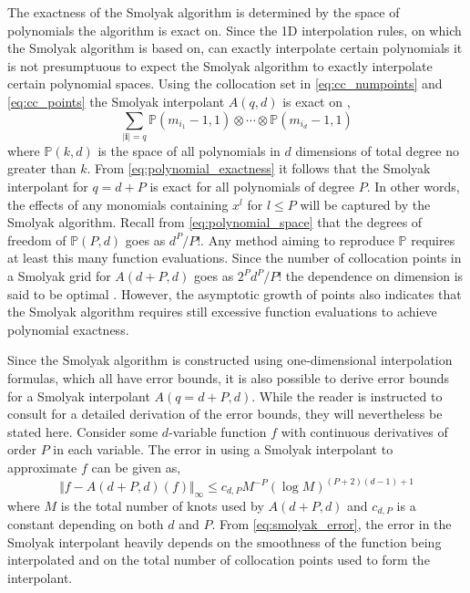 The exactness of the Smolyak algorithm is determined by the space of polynomials the algorithm is exact on. Since the 1D interpolation rules, on which the Smolyak algorithm is based on, can exactly interpolate certain polynomials it is not presumptuous to expect the Smolyak algorithm to exactly interpolate certain polynomial spaces. Using the collocation set in \ref{eq:cc_numpoints} and \ref{eq:cc_points} the Smolyak interpolant $A(q,d)$ is exact on \cite{NovakRitter},
\begin{equation} \label{eq:polynomial_exactness}
    \sum_{\vert\textbf{i}\vert = q}
     \mathbb{P}(m_{i_1}-1,1)\otimes\cdots\otimes
      \mathbb{P}(m_{i_d}-1,1)
\end{equation} 
where $\mathbb{P}(k,d)$ is the space of all polynomials in $d$ dimensions of total degree no greater than $k$. From \ref{eq:polynomial_exactness} it follows that the Smolyak interpolant for $q=d+P$ is exact for all polynomials of degree $P$. In other words, the effects of any monomials containing $x^l$ for $l\leq P$ will be captured by the Smolyak algorithm. Recall from \ref{eq:polynomial_space} that the degrees of freedom of $\mathbb{P}(P,d)$ goes as $d^P/P!$. Any method aiming to reproduce $\mathbb{P}$ requires at least this many function evaluations. Since the number of collocation points in a Smolyak grid for $A(d+P,d)$ goes as $2^{P}d^{P}/P!$ the dependence on dimension is said to be optimal \cite{NovakRitter}. However, the asymptotic growth of points also indicates that the Smolyak algorithm requires still excessive function evaluations to achieve polynomial exactness.     

Since the Smolyak algorithm is constructed using one-dimensional interpolation formulas, which all have error bounds, it is also possible to derive error bounds for a Smolyak interpolant $A(q=d+P,d)$. While the reader is instructed to consult \cite{NovakRitter} for a detailed derivation of the error bounds, they will nevertheless be stated here. Consider some $d$-variable function $f$ with continuous derivatives of order $P$ in each variable. The error in using a Smolyak interpolant to approximate $f$ can be given as,
\begin{equation} \label{eq:smolyak_error}
    \Vert f-A(d+P,d)(f)\Vert_{\infty} \leq 
     c_{d,P} M^{-P} (\log M)^{(P+2)(d-1)+1}
\end{equation}
where $M$ is the total number of knots used by $A(d+P,d)$ and $c_{d,P}$ is a constant depending on both $d$ and $P$. From \ref{eq:smolyak_error}, the error in the Smolyak interpolant heavily depends on the smoothness of the function being interpolated and on the total number of collocation points used to form the interpolant.       

